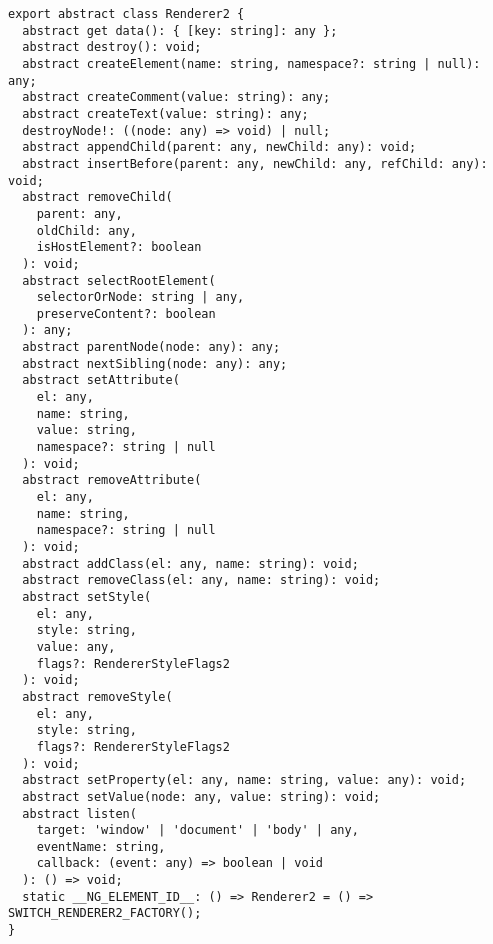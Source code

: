 \begin{verbatim}
export abstract class Renderer2 {
  abstract get data(): { [key: string]: any };
  abstract destroy(): void;
  abstract createElement(name: string, namespace?: string | null): any;
  abstract createComment(value: string): any;
  abstract createText(value: string): any;
  destroyNode!: ((node: any) => void) | null;
  abstract appendChild(parent: any, newChild: any): void;
  abstract insertBefore(parent: any, newChild: any, refChild: any): void;
  abstract removeChild(
    parent: any,
    oldChild: any,
    isHostElement?: boolean
  ): void;
  abstract selectRootElement(
    selectorOrNode: string | any,
    preserveContent?: boolean
  ): any;
  abstract parentNode(node: any): any;
  abstract nextSibling(node: any): any;
  abstract setAttribute(
    el: any,
    name: string,
    value: string,
    namespace?: string | null
  ): void;
  abstract removeAttribute(
    el: any,
    name: string,
    namespace?: string | null
  ): void;
  abstract addClass(el: any, name: string): void;
  abstract removeClass(el: any, name: string): void;
  abstract setStyle(
    el: any,
    style: string,
    value: any,
    flags?: RendererStyleFlags2
  ): void;
  abstract removeStyle(
    el: any,
    style: string,
    flags?: RendererStyleFlags2
  ): void;
  abstract setProperty(el: any, name: string, value: any): void;
  abstract setValue(node: any, value: string): void;
  abstract listen(
    target: 'window' | 'document' | 'body' | any,
    eventName: string,
    callback: (event: any) => boolean | void
  ): () => void;
  static __NG_ELEMENT_ID__: () => Renderer2 = () => SWITCH_RENDERER2_FACTORY();
}
\end{verbatim}
